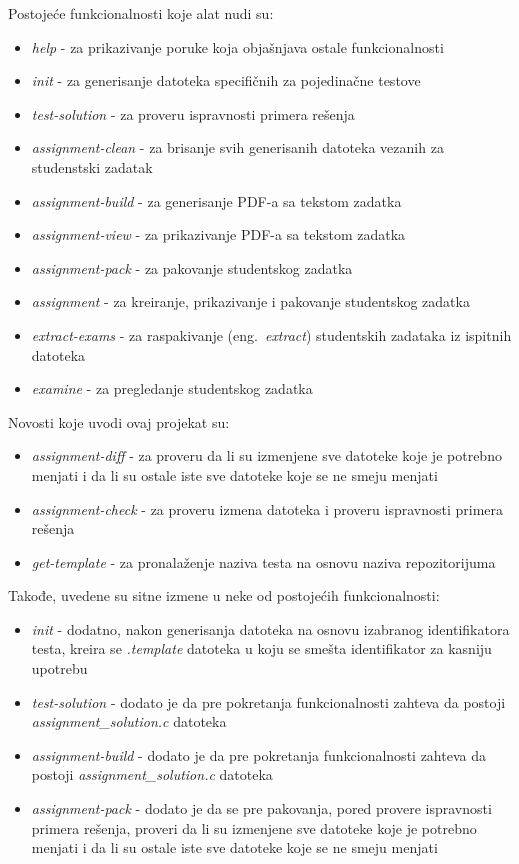 \documentclass[12pt]{report}
\begin{document}
Postojeće funkcionalnosti koje alat nudi su:

\begin{itemize}
    \item \textit{help} - za prikazivanje poruke koja objašnjava ostale funkcionalnosti
    \item \textit{init} - za generisanje datoteka specifičnih za pojedinačne testove
    \item \textit{test-solution} - za proveru ispravnosti primera rešenja
    \item \textit{assignment-clean} - za brisanje svih generisanih datoteka vezanih za studenstski zadatak
    \item \textit{assignment-build} - za generisanje PDF-a sa tekstom zadatka
    \item \textit{assignment-view} - za prikazivanje PDF-a sa tekstom zadatka
    \item \textit{assignment-pack} - za pakovanje studentskog zadatka
    \item \textit{assignment} - za kreiranje, prikazivanje i pakovanje studentskog zadatka
    \item \textit{extract-exams} - za raspakivanje (eng.\ \textit{extract}) studentskih zadataka iz ispitnih datoteka
    \item \textit{examine} - za pregledanje studentskog zadatka
\end{itemize}

Novosti koje uvodi ovaj projekat su:

\begin{itemize}
    \item \textit{assignment-diff} - za proveru da li su izmenjene sve datoteke koje je potrebno menjati i da li su ostale iste sve datoteke koje se ne smeju menjati
    \item \textit{assignment-check} - za proveru izmena datoteka i proveru ispravnosti primera rešenja
    \item \textit{get-template} - za pronalaženje naziva testa na osnovu naziva repozitorijuma
\end{itemize}

Takođe, uvedene su sitne izmene u neke od postojećih funkcionalnosti:

\begin{itemize}
    \item \textit{init} - dodatno, nakon generisanja datoteka na osnovu izabranog identifikatora testa, kreira se \textit{.template} datoteka u koju se smešta identifikator za kasniju upotrebu
    \item \textit{test-solution} - dodato je da pre pokretanja funkcionalnosti zahteva da postoji \textit{assignment\_solution.c} datoteka
    \item \textit{assignment-build} - dodato je da pre pokretanja funkcionalnosti zahteva da postoji \textit{assignment\_solution.c} datoteka
    \item \textit{assignment-pack} - dodato je da se pre pakovanja, pored provere ispravnosti primera rešenja, proveri da li su izmenjene sve datoteke koje je potrebno menjati i da li su ostale iste sve datoteke koje se ne smeju menjati
\end{itemize}
\end{document}
